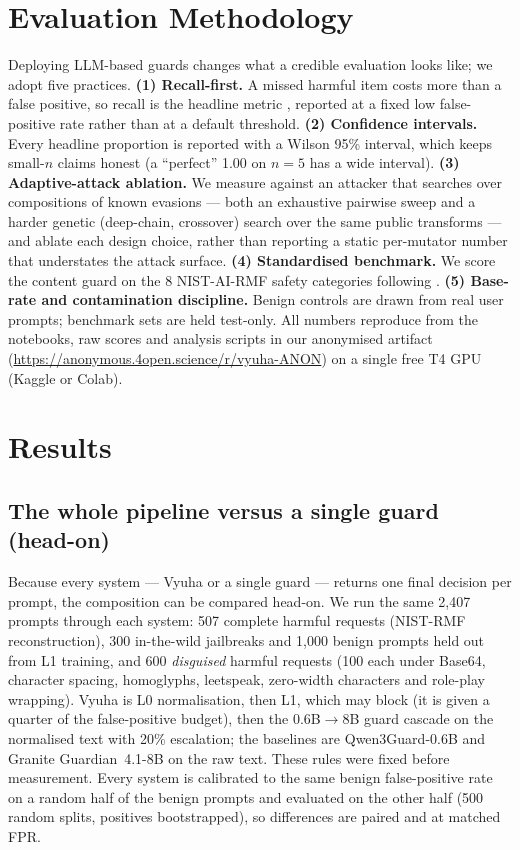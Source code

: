 \documentclass[11pt]{article}
\newcommand{\artifacturl}{\url{https://anonymous.4open.science/r/vyuha-ANON}}
\begin{document}
\section{Evaluation Methodology}
Deploying LLM-based guards changes what a credible evaluation looks like; we adopt five practices.
\textbf{(1) Recall-first.} A missed harmful item costs more than a false positive, so recall is the
headline metric \citep{guard-bench}, reported at a fixed low false-positive rate rather than at a
default threshold. \textbf{(2) Confidence intervals.} Every headline proportion is reported with a
Wilson 95\% interval, which keeps small-$n$ claims honest (a ``perfect'' 1.00 on $n{=}5$ has a wide
interval). \textbf{(3) Adaptive-attack ablation.} We measure against an attacker that searches over
compositions of known evasions --- both an exhaustive pairwise sweep and a harder genetic
(deep-chain, crossover) search over the same public transforms --- and ablate each design choice,
rather than reporting a static per-mutator number that understates the attack surface. \textbf{(4) Standardised benchmark.} We score
the content guard on the 8 NIST-AI-RMF safety categories following \citet{guard-bench}.
\textbf{(5) Base-rate and contamination discipline.} Benign controls are drawn from real user
prompts; benchmark sets are held test-only. All numbers reproduce from the notebooks, raw scores and analysis scripts in our anonymised artifact
(\artifacturl) on a single free T4 GPU (Kaggle or Colab).

\section{Results}
\subsection{The whole pipeline versus a single guard (head-on)}
Because every system --- Vyuha or a single guard --- returns one final decision per prompt, the
composition can be compared head-on. We run the same 2,407 prompts through each system: 507 complete
harmful requests (NIST-RMF reconstruction), 300 in-the-wild jailbreaks and 1,000 benign prompts held out
from L1 training, and 600 \emph{disguised} harmful requests (100 each under Base64, character spacing,
homoglyphs, leetspeak, zero-width characters and role-play wrapping). Vyuha is L0 normalisation, then L1,
which may block (it is given a quarter of the false-positive budget), then the 0.6B$\rightarrow$8B guard
cascade on the normalised text with 20\% escalation; the baselines are Qwen3Guard-0.6B and Granite
Guardian~4.1-8B on the raw text. These rules were fixed before measurement. Every system is calibrated to
the same benign false-positive rate on a random half of the benign prompts and evaluated on the other half
(500 random splits, positives bootstrapped), so differences are paired and at matched FPR.
\end{document}
